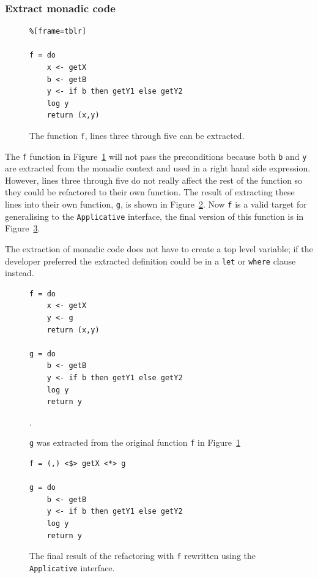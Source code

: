 \subsubsection{Extract monadic code}
\label{subSec:extract}

\begin{figure}[t]
\begin{lstlisting}%[frame=tblr]

f = do
	x <- getX
	b <- getB
	y <- if b then getY1 else getY2
	log y
	return (x,y)	
\end{lstlisting}
\caption{The function \texttt{f}, lines three through five can be extracted.}
\label{fMonad}
\end{figure}


The \texttt{f} function in Figure~\ref{fMonad} will not pass the preconditions because both \texttt{b} and \texttt{y} are extracted from the monadic context and used in a right hand side expression. However, lines three through five do not really affect the rest of the function so they could be refactored to their own function. The result of extracting these lines into their own function, \texttt{g}, is shown in Figure~\ref{gExtracted}. Now \texttt{f} is a valid target for generalising to the \texttt{Applicative} interface, the final version of this function is in Figure~\ref{fToApp}.

The extraction of monadic code does not have to create a top level variable; if the developer preferred the extracted definition could be in a \texttt{let} or \texttt{where} clause instead.

\begin{figure}[t]
\begin{lstlisting}
f = do
	x <- getX
	y <- g
	return (x,y)

g = do
	b <- getB
	y <- if b then getY1 else getY2
	log y
	return y
\end{lstlisting}
\caption{\texttt{g} was extracted from the original function \texttt{f} in Figure~\ref{fMonad}}.
\label{gExtracted}
\end{figure}

\begin{figure}[t]
\begin{lstlisting}
f = (,) <$> getX <*> g

g = do
	b <- getB
	y <- if b then getY1 else getY2
	log y
	return y
\end{lstlisting}
\caption{The final result of the refactoring with \texttt{f} rewritten using the \texttt{Applicative} interface.}
\label{fToApp}
\end{figure}

